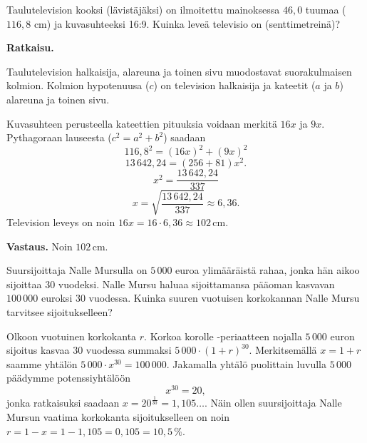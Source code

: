 \begin{esimerkki}
Taulutelevision kooksi (lävistäjäksi) on ilmoitettu mainoksessa $46,0$ tuumaa ($116,8$ cm) ja kuvasuhteeksi 16:9. Kuinka leveä televisio on (senttimetreinä)?


{\bf Ratkaisu.}

Taulutelevision halkaisija, alareuna ja toinen sivu muodostavat suorakulmaisen kolmion. Kolmion hypotenuusa ($c$) on television halkaisija ja kateetit ($a$ ja $b$) alareuna ja toinen sivu.

Kuvasuhteen perusteella kateettien pituuksia voidaan merkitä $16x$ ja $9x$. Pythagoraan lauseesta ($c^2 = a^2 + b^2$) saadaan
\[
116,8^2 = (16x)^2 + (9x)^2
\]
\[
13\,642,24 = (256+81)x^2.
\]
\[
x^2 = \frac{13\,642,24}{337}
\]
\[
x= \sqrt{\frac{13\,642,24}{337}} \approx 6,36.
\]
Television leveys on noin $16x = 16\cdot 6,36\approx 102$\,cm.

{\bf Vastaus.} Noin $102$\,cm.
\end{esimerkki}


\begin{esimerkki}
	Suursijoittaja Nalle Mursulla on $5\,000$ euroa ylimääräistä rahaa, jonka hän aikoo sijoittaa $30$ vuodeksi.  Nalle Mursu haluaa sijoittamansa pääoman kasvavan $100\,000$ euroksi $30$ vuodessa.  Kuinka suuren vuotuisen korkokannan Nalle Mursu tarvitsee sijoitukselleen? 
	\begin{esimratk}
		Olkoon vuotuinen korkokanta $r$. Korkoa korolle -periaatteen nojalla $5\,000$ euron sijoitus
		kasvaa $30$ vuodessa summaksi $5\,000\cdot(1+r)^{30}$. Merkitsemällä $x=1+r$ saamme yhtälön $5\,000\cdot x^{30} = 100\,000$.
		Jakamalla yhtälö puolittain luvulla $5\,000$ päädymme potenssiyhtälöön
		\[ x^{30} = 20, \] 
		jonka ratkaisuksi saadaan $x=20^{\frac{1}{30}} = 1{,}105\ldots$. Näin
		ollen suursijoittaja Nalle Mursun vaatima korkokanta sijoitukselleen on noin $r=1-x=1-1,105=0,105=10{,}5\,\%$.
	\end{esimratk}
\end{esimerkki}
